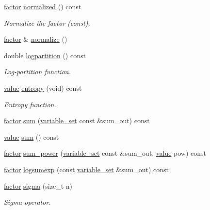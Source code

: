 \begin{DoxyCompactItemize}
\hyperlink{classmerlin_1_1factor}{factor} \hyperlink{classmerlin_1_1factor_a7b01ffd47db2ae23a335cfa35aa8d009}{normalized} () const 
\begin{DoxyCompactList}\small\item\em Normalize the factor (const). \end{DoxyCompactList}\item 
\hyperlink{classmerlin_1_1factor}{factor} \& \hyperlink{classmerlin_1_1factor_aa206a9e2476ae5000107d5f9eb3115df}{normalize} ()
\item 
double \hyperlink{classmerlin_1_1factor_a8d9d1856e06f43abb75a52eb9ca21585}{logpartition} () const 
\begin{DoxyCompactList}\small\item\em Log-\/partition function. \end{DoxyCompactList}\item 
\hyperlink{classmerlin_1_1factor_a1b14d19e509403448fbef26b003c9281}{value} \hyperlink{classmerlin_1_1factor_a299da4a7718db9c81a9764cdafa9661a}{entropy} (void) const 
\begin{DoxyCompactList}\small\item\em Entropy function. \end{DoxyCompactList}\item 
\hyperlink{classmerlin_1_1factor}{factor} \hyperlink{classmerlin_1_1factor_a0031157664d5275bd1a67aa4f6bec8ea}{sum} (\hyperlink{classmerlin_1_1variable__set}{variable\+\_\+set} const \&sum\+\_\+out) const 
\item 
\hyperlink{classmerlin_1_1factor_a1b14d19e509403448fbef26b003c9281}{value} \hyperlink{classmerlin_1_1factor_a71ac1b23c5741129746dd7b0c8615761}{sum} () const 
\item 
\hyperlink{classmerlin_1_1factor}{factor} \hyperlink{classmerlin_1_1factor_a8bbad2b8a421859a201c6f61bed20978}{sum\+\_\+power} (\hyperlink{classmerlin_1_1variable__set}{variable\+\_\+set} const \&sum\+\_\+out, \hyperlink{classmerlin_1_1factor_a1b14d19e509403448fbef26b003c9281}{value} pow) const 
\item 
\hyperlink{classmerlin_1_1factor}{factor} \hyperlink{classmerlin_1_1factor_a0f748337f4dab76655a0866cbc99efa8}{logsumexp} (const \hyperlink{classmerlin_1_1variable__set}{variable\+\_\+set} \&sum\+\_\+out) const 
\item 
\hyperlink{classmerlin_1_1factor}{factor} \hyperlink{classmerlin_1_1factor_a8eef5d340bf8ef554f17846508131fe6}{sigma} (size\+\_\+t n)
\begin{DoxyCompactList}\small\item\em Sigma operator. \end{DoxyCompactList}\item 

\end{DoxyCompactItemize}

